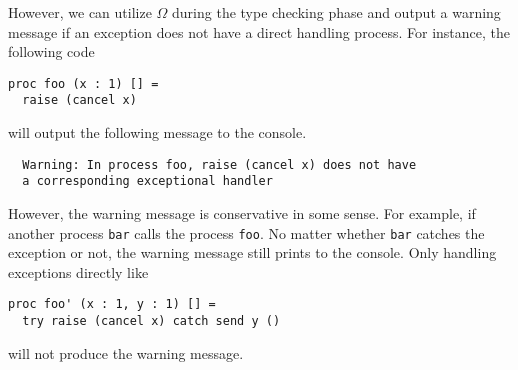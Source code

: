 \documentclass[12pt, openany]{memoir}
\begin{document}
However, we can utilize $\Omega$ during the type checking phase and output a warning message
if an exception does not have a direct handling process. For instance, the following code 
\begin{lstlisting}
proc foo (x : 1) [] = 
  raise (cancel x)
\end{lstlisting}
will output the following message to the console.
\begin{verbatim}
  Warning: In process foo, raise (cancel x) does not have 
  a corresponding exceptional handler
\end{verbatim}
However, the warning message is conservative in some sense. For example,
if another process \texttt{bar} calls the process \texttt{foo}. No matter whether \texttt{bar} catches the exception or not,  
the warning message still prints to the console. Only handling exceptions directly like
\begin{lstlisting}
proc foo' (x : 1, y : 1) [] =
  try raise (cancel x) catch send y ()
\end{lstlisting}
will not produce the warning message.
\end{document}
